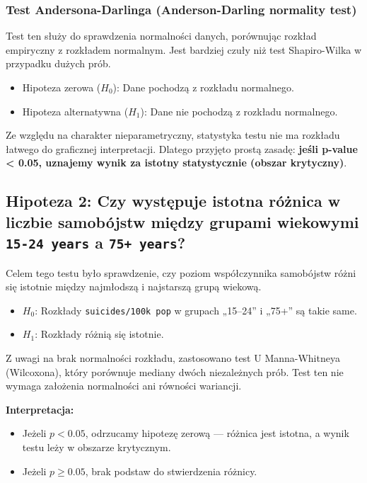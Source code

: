 \documentclass[polish]{article}
\begin{document}
    \subsubsection*{Test Andersona-Darlinga (Anderson-Darling normality test)}

    Test ten służy do sprawdzenia normalności danych, porównując rozkład empiryczny z rozkładem normalnym. Jest bardziej czuły niż test Shapiro-Wilka w przypadku dużych prób.

    \begin{itemize}
        \item Hipoteza zerowa (\(H_0\)): Dane pochodzą z rozkładu normalnego.
        \item Hipoteza alternatywna (\(H_1\)): Dane nie pochodzą z rozkładu normalnego.
    \end{itemize}

    Ze względu na charakter nieparametryczny, statystyka testu nie ma rozkładu łatwego do graficznej interpretacji. Dlatego przyjęto prostą zasadę: \textbf{jeśli p-value < 0.05, uznajemy wynik za istotny statystycznie (obszar krytyczny)}.

    \newpage

    \subsection{Hipoteza 2: Czy występuje istotna różnica w liczbie samobójstw między grupami wiekowymi \texttt{15-24 years} a \texttt{75+ years}?}

    Celem tego testu było sprawdzenie, czy poziom współczynnika samobójstw różni się istotnie między najmłodszą i najstarszą grupą wiekową.

    \begin{itemize}
        \item \( H_0 \): Rozkłady \texttt{suicides/100k pop} w grupach „15–24” i „75+” są takie same.
        \item \( H_1 \): Rozkłady różnią się istotnie.
    \end{itemize}

    Z uwagi na brak normalności rozkładu, zastosowano test U Manna-Whitneya (Wilcoxona), który porównuje mediany dwóch niezależnych prób. Test ten nie wymaga założenia normalności ani równości wariancji.

    \textbf{Interpretacja:}
    \begin{itemize}
        \item Jeżeli \( p < 0.05 \), odrzucamy hipotezę zerową — różnica jest istotna, a wynik testu leży w obszarze krytycznym.
        \item Jeżeli \( p \geq 0.05 \), brak podstaw do stwierdzenia różnicy.
    \end{itemize}
\end{document}
